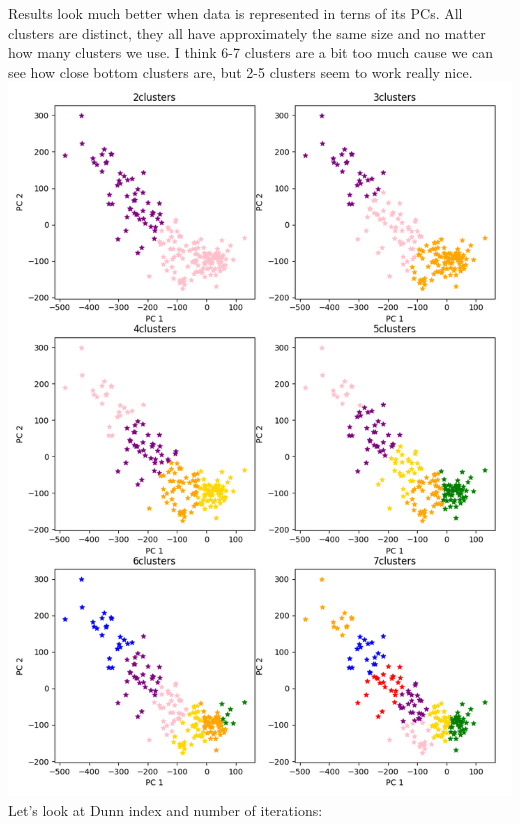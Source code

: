 \documentclass[12pt, letterpaper]{article}
\begin{document}
\begin{enumerate}[label=\Roman*.]
\begin{enumerate}[label=\arabic*.]
		Results look much better when data is represented in terns of its PCs. All clusters are distinct, they all have approximately the same size and no matter how many clusters we use. I think 6-7 clusters are a bit too much cause we can see how close bottom clusters are, but 2-5 clusters seem to work really nice.\\
		\includegraphics[scale=0.71]{clusters_kpcs.png} \\
		Let's look at Dunn index and number of iterations:\\

\end{enumerate}
\end{enumerate}
\end{document}
